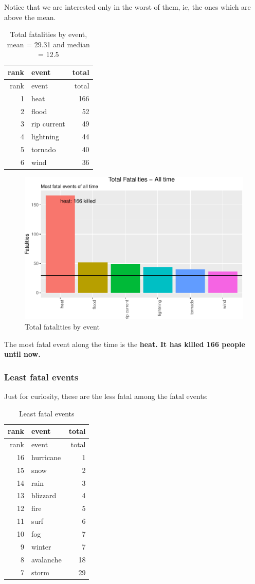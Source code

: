 \documentclass[]{article}
\begin{document}
Notice that we are interested only in the worst of them, ie, the ones
which are above the mean.

\begin{longtable}[]{@{}rlr@{}}
\caption{Total fatalities by event, mean = 29.31 and median =
12.5}\tabularnewline
\toprule
rank & event & total\tabularnewline
\midrule
\endfirsthead
\toprule
rank & event & total\tabularnewline
\midrule
\endhead
1 & heat & 166\tabularnewline
2 & flood & 52\tabularnewline
3 & rip current & 49\tabularnewline
4 & lightning & 44\tabularnewline
5 & tornado & 40\tabularnewline
6 & wind & 36\tabularnewline
\bottomrule
\end{longtable}

\begin{figure}[htbp]
\centering
\includegraphics{readme_files/figure-latex/fatal-plot-alltime-1.pdf}
\caption{Total fatalities by event}
\end{figure}

The most fatal event along the time is the \textbf{heat. It has killed
166 people until now.}

\subsubsection{Least fatal events}\label{least-fatal-events}

Just for curiosity, these are the less fatal among the fatal events:

\begin{longtable}[]{@{}rlr@{}}
\caption{Least fatal events}\tabularnewline
\toprule
rank & event & total\tabularnewline
\midrule
\endfirsthead
\toprule
rank & event & total\tabularnewline
\midrule
\endhead
16 & hurricane & 1\tabularnewline
15 & snow & 2\tabularnewline
14 & rain & 3\tabularnewline
13 & blizzard & 4\tabularnewline
12 & fire & 5\tabularnewline
11 & surf & 6\tabularnewline
10 & fog & 7\tabularnewline
9 & winter & 7\tabularnewline
8 & avalanche & 18\tabularnewline
7 & storm & 29\tabularnewline
\bottomrule
\end{longtable}
\end{document}
